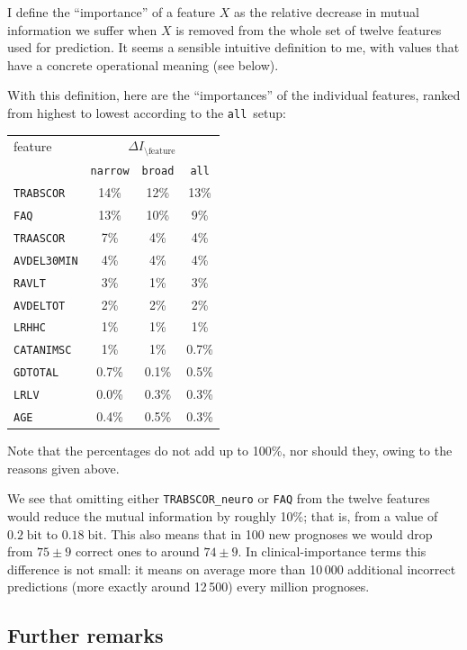 \documentclass[\ifafour a4paper,12pt,\else a5paper,10pt,\fi%
onecolumn,oneside,article,%
british%
]{memoir}
\theoremstyle{remark}
\theoremstyle{innote}
\renewcommand*{\|}[1][]{\nonscript\:#1\vert\nonscript\:\mathopen{}}
\newcommand*{\bit}{\textrm{bit}}
\newcommand*{\narrow}{\texttt{narrow}}
\newcommand*{\broad}{\texttt{broad}}
\newcommand*{\all}{\texttt{all}}
\begin{document}
I define the \enquote{importance} of a feature $X$ as the relative decrease
in mutual information we suffer when $X$ is removed from the whole set of
twelve features used for prediction. It seems a sensible intuitive definition to
me, with values that have a concrete operational meaning (see below).

With this definition, here are the \enquote{importances} of the individual features,
ranked from highest to lowest according to the \all\ setup:
\begin{center}
  \begin{tabular}[c]{l|ccc}
    feature &\multicolumn{3}{c}{$\Delta I_{\setminus\text{feature}}$} \\
    & \narrow & \broad & \all \\
\hline
\texttt{TRABSCOR} & 14\% & 12\% & 13\%\\
\texttt{FAQ} & 13\% & 10\% & 9\%\\
\texttt{TRAASCOR} & 7\% & 4\% & 4\%\\
\texttt{AVDEL30MIN} & 4\% & 4\% & 4\%\\
\texttt{RAVLT} & 3\% & 1\% & 3\%\\
\texttt{AVDELTOT} & 2\% & 2\% & 2\%\\
\texttt{LRHHC} & 1\% & 1\% & 1\%\\
\texttt{CATANIMSC} & 1\% & 1\% & 0.7\%\\
\texttt{GDTOTAL} & 0.7\% & 0.1\% & 0.5\%\\
\texttt{LRLV} & 0.0\% & 0.3\% & 0.3\%\\
\texttt{AGE} & 0.4\% & 0.5\% & 0.3\%
  \end{tabular}
\end{center}
Note that the percentages do not add up to 100\%, nor should they, owing to
the reasons given above.

We see that omitting either \texttt{TRABSCOR\_neuro} or \texttt{FAQ} from
the twelve features would reduce the mutual information by roughly 10\%;
that is, from a value of $0.2\;\bit$ to $0.18\;\bit$. This also means that
in 100 new prognoses we would drop from $75\pm 9$ correct ones to around
$74\pm 9$. In clinical-importance terms this difference is not small: it
means on average more than 10\,000 additional incorrect predictions (more
exactly around 12\,500) every million prognoses.

\subsection{Further remarks}
\label{sec:remarks}
\end{document}
